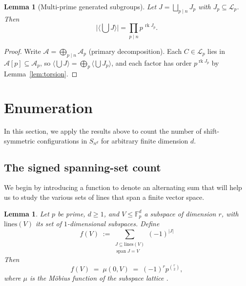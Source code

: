 \documentclass[11pt,a4paper]{article}
\newtheorem{lemma}[theorem]{Lemma}
\theoremstyle{remark}
\DeclareMathOperator{\rk}{rk}
\newcommand{\FF}{\mathbb{F}}
\newcommand{\A}{\mathcal{A}}
\begin{document}
\begin{lemma}[Multi-prime generated subgroups]\label{lem:joins}
Let $J=\bigsqcup_{p\mid n}J_p$ with $J_p\subseteq\mathcal L_p$. Then
\[\bigl|\langle\bigcup J\rangle\bigr|=\prod_{p\mid n}p^{\,\rk J_p}.\]
\end{lemma}

\begin{proof}
Write $\A=\bigoplus_{p\mid n}\A_p$ (primary decomposition). Each
$C\in\mathcal L_p$ lies in $\A[p]\subseteq\A_p$, so $\langle\bigcup
J\rangle=\bigoplus_p\langle\bigcup J_p\rangle$, and each factor has order
$p^{\rk J_p}$ by Lemma~\ref{lem:torsion}.
\end{proof}

\section{Enumeration}\label{sec:enumeration}

In this section, we apply the results above to count the number of shift-symmetric configurations in $S_{n^d}$ for arbitrary finite dimension $d$.


\subsection{The signed spanning-set count}

We begin by introducing a function to denote an alternating sum that will help us to study the various sets of lines that span a finite vector space.

\begin{lemma}\label{lem:mobius}
Let $p$ be prime, $d\ge1$, and $V\le\FF_p^d$ a subspace of dimension $r$,
with $\mathrm{lines}(V)$ its set of $1$-dimensional subspaces. Define 
\[f(V)\;:=\!\!\sum_{\substack{J\subseteq\mathrm{lines}(V)\\
  \operatorname{span}J=V}}\!\!(-1)^{|J|}
\]
Then
\[
  f(V)\;=\;\mu(0,V)\;=\;(-1)^r p^{\binom r2},
\]
where $\mu$ is the M\"obius function of the subspace lattice
\cite[Ex.~3.10.2]{stanley2012}.
\end{lemma}
\end{document}
